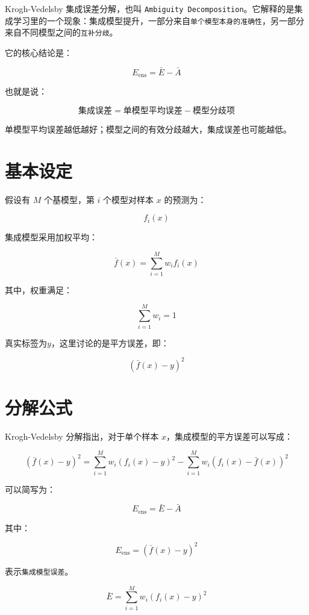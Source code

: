 Krogh-Vedelsby 集成误差分解，也叫 \verb|Ambiguity Decomposition|。它解释的是集成学习里的一个现象：集成模型提升，一部分来自\verb|单个模型本身的准确性|，另一部分来自不同模型之间的\verb|互补分歧|。

它的核心结论是：

\[
E_{\text{ens}} = \bar{E} - \bar{A}
\]

也就是说：

\[
集成误差 = 单模型平均误差 - 模型分歧项
\]

单模型平均误差越低越好；模型之间的有效分歧越大，集成误差也可能越低。

\section{基本设定}

假设有 \(M\) 个基模型，第 \(i\) 个模型对样本 \(x\) 的预测为：

\[
f_i(x)
\]

集成模型采用加权平均：

\[
\bar{f}(x) = \sum_{i=1}^{M} w_i f_i(x)
\]

其中，权重满足：

\[
\sum_{i=1}^{M} w_i = 1
\]

真实标签为\(y\)，这里讨论的是平方误差，即：

\[
\left(\bar{f}(x)-y\right)^2
\]

\section{分解公式}

Krogh-Vedelsby 分解指出，对于单个样本 \(x\)，集成模型的平方误差可以写成：

\[
\left(\bar{f}(x)-y\right)^2
=
\sum_{i=1}^{M} w_i\left(f_i(x)-y\right)^2
-
\sum_{i=1}^{M} w_i\left(f_i(x)-\bar{f}(x)\right)^2
\]

可以简写为：

\[
E_{\text{ens}} = \bar{E} - \bar{A}
\]

其中：

\[
E_{\text{ens}} = \left(\bar{f}(x)-y\right)^2
\]

表示\verb|集成模型误差|。

\[
\bar{E} = \sum_{i=1}^{M} w_i\left(f_i(x)-y\right)^2
\]

